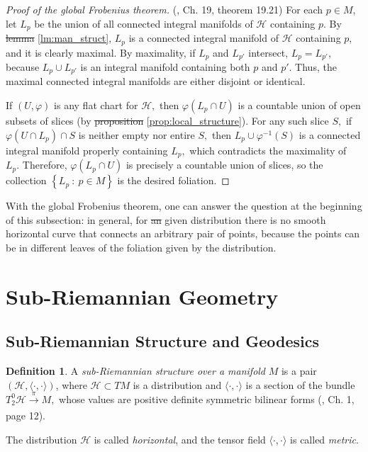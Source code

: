 \documentclass[12pt, letterpaper, reqno]{amsart}
\theoremstyle{definition}
\newtheorem{df}{Definition}
\theoremstyle{plain}
\theoremstyle{remark}
\providecommand{\DIFadd}[1]{{\protect\color{blue}\uwave{#1}}} %
\providecommand{\DIFdel}[1]{{\protect\color{red}\sout{#1}}}                      %
\providecommand{\DIFaddbegin}{} %
\providecommand{\DIFaddend}{} %
\providecommand{\DIFdelbegin}{} %
\providecommand{\DIFdelend}{} %
\newcommand{\DIFscaledelfig}{0.5}
\newlength{\DIFdelgraphicswidth} %
\newlength{\DIFdelgraphicsheight} %
\newcommand{\DIFaddincludegraphics}[2][]{{\color{blue}\fbox{\DIFOincludegraphics[#1]{#2}}}} %
\newcommand{\DIFdelincludegraphics}[2][]{%
\sbox{\DIFdelgraphicsbox}{\DIFOincludegraphics[#1]{#2}}%
\settoboxwidth{\DIFdelgraphicswidth}{\DIFdelgraphicsbox} %
\settoboxtotalheight{\DIFdelgraphicsheight}{\DIFdelgraphicsbox} %
\scalebox{\DIFscaledelfig}{%
\parbox[b]{\DIFdelgraphicswidth}{\usebox{\DIFdelgraphicsbox}\\[-\baselineskip] \rule{\DIFdelgraphicswidth}{0em}}\llap{\resizebox{\DIFdelgraphicswidth}{\DIFdelgraphicsheight}{%
\setlength{\unitlength}{\DIFdelgraphicswidth}%
\begin{picture}(1,1)%
\thicklines\linethickness{2pt} %
{\color[rgb]{1,0,0}\put(0,0){\framebox(1,1){}}}%
{\color[rgb]{1,0,0}\put(0,0){\line( 1,1){1}}}%
{\color[rgb]{1,0,0}\put(0,1){\line(1,-1){1}}}%
\end{picture}%
}\hspace*{3pt}}} %
} %
\DeclareRobustCommand{\DIFaddbegin}{\DIFOaddbegin \let\includegraphics\DIFaddincludegraphics} %
\DeclareRobustCommand{\DIFaddend}{\DIFOaddend \let\includegraphics\DIFOincludegraphics} %
\DeclareRobustCommand{\DIFdelbegin}{\DIFOdelbegin \let\includegraphics\DIFdelincludegraphics} %
\DeclareRobustCommand{\DIFdelend}{\DIFOaddend \let\includegraphics\DIFOincludegraphics} %
\begin{document}
\begin{proof}[Proof of the global Frobenius theorem]
	(\cite{lee2003introduction}, Ch. 19, theorem 19.21) For each $ p\in M $, let $ L_p $ be the union of all connected integral manifolds of $ \mathcal{H} $ containing $ p. $ By \DIFdelbegin \DIFdel{lemma }\DIFdelend \DIFaddbegin \DIFadd{Lemma }\DIFaddend \ref{lm:man_struct}, $ L_p $ is a connected integral manifold of $ \mathcal{H} $ containing $ p $, and it is clearly maximal. By maximality, if $ L_p $ and $ L_{p'} $ intersect, $ L_p=L_{p'} $, because $ L_p\cup L_{p'} $ is an integral manifold containing both $ p $ and $ p' $. Thus, the maximal connected integral manifolds are either disjoint or identical.    

	If $ (U,\varphi) $ is any flat chart for $ \mathcal{H}, $ then $ \varphi(L_p\cap U) $ is a countable union of open subsets of slices (by \DIFdelbegin \DIFdel{proposition }\DIFdelend \DIFaddbegin \DIFadd{Proposition }\DIFaddend \ref{prop:local_structure}). For any such slice $ S, $ if $ \varphi(U\cap L_p)\cap S $ is neither empty nor entire $ S, $ then $ L_p\cup \varphi^{-1}(S )$ is a connected integral manifold properly containing $ L_p, $ which contradicts the maximality of $ L_p. $ Therefore, $ \varphi(L_p\cap U) $ is precisely a countable union of slices, so the collection $ \left\{ L_p\ : \ p\in M \right\} $ is the desired foliation.
\end{proof}

With the global Frobenius theorem, one can answer the question at the beginning of this subsection: in general, for \DIFdelbegin \DIFdel{an }\DIFdelend \DIFaddbegin \DIFadd{any }\DIFaddend given distribution there is no smooth horizontal curve that connects an arbitrary pair of points, because the points can be in different leaves of the foliation given by the distribution.


\section{Sub-Riemannian Geometry}%
\label{sec:sub-Riemannian_geometry}

\subsection{Sub-Riemannian Structure and Geodesics}%
\label{sub:sub-Riemannian_structure_and_geodesics}
\begin{df}
	A \textit{sub-Riemannian structure over a manifold} $ M $ is a pair $ (\mathcal{H}, \langle\cdot,\cdot\rangle)$, where $ \mathcal{H}\subset TM $ is a distribution and $ \langle\cdot,\cdot\rangle $ is a section of the bundle $ T^0_2 \mathcal{H} \xrightarrow[]{\pi} M, $ whose values are positive definite symmetric bilinear forms (\cite{hatcher2003vector}, Ch. 1, page 12).

	The distribution $ \mathcal{H} $ is called \textit{horizontal}, and the tensor field $ \langle\cdot,\cdot\rangle $ is called \textit{metric}.  
\end{df}
\end{document}

